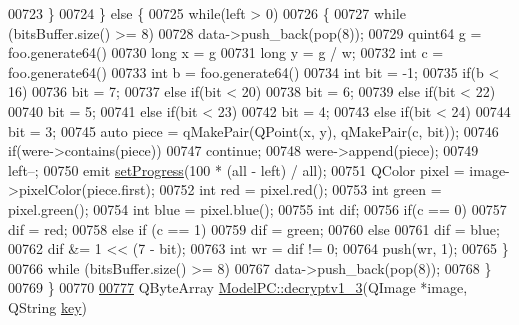 \begin{DoxyCode}
00723         \}
00724     \} \textcolor{keywordflow}{else} \{
00725         \textcolor{keywordflow}{while}(left > 0)
00726         \{
00727             \textcolor{keywordflow}{while} (bitsBuffer.size() >= 8)
00728                 data->push\_back(pop(8));
00729             quint64 g = foo.generate64() %
00730             \textcolor{keywordtype}{long} x = g %
00731             \textcolor{keywordtype}{long} y = g / w;
00732             \textcolor{keywordtype}{int} c = foo.generate64() %
00733             \textcolor{keywordtype}{int} b = foo.generate64() %
00734             \textcolor{keywordtype}{int} bit = -1;
00735             \textcolor{keywordflow}{if}(b < 16)
00736                 bit = 7;
00737             \textcolor{keywordflow}{else} \textcolor{keywordflow}{if}(bit < 20)
00738                 bit = 6;
00739             \textcolor{keywordflow}{else} \textcolor{keywordflow}{if}(bit < 22)
00740                 bit = 5;
00741             \textcolor{keywordflow}{else} \textcolor{keywordflow}{if}(bit < 23)
00742                 bit = 4;
00743             \textcolor{keywordflow}{else} \textcolor{keywordflow}{if}(bit < 24)
00744                 bit = 3;
00745             \textcolor{keyword}{auto} piece = qMakePair(QPoint(x, y), qMakePair(c, bit));
00746             \textcolor{keywordflow}{if}(were->contains(piece))
00747                 \textcolor{keywordflow}{continue};
00748             were->append(piece);
00749             left--;
00750             emit \hyperlink{class_model_p_c_afdcd80f0ed5062e145a71f09b0897547}{setProgress}(100 * (all - left) / all);
00751             QColor pixel = image->pixelColor(piece.first);
00752             \textcolor{keywordtype}{int} red = pixel.red();
00753             \textcolor{keywordtype}{int} green = pixel.green();
00754             \textcolor{keywordtype}{int} blue = pixel.blue();
00755             \textcolor{keywordtype}{int} dif;
00756             \textcolor{keywordflow}{if}(c == 0)
00757                 dif = red;
00758             \textcolor{keywordflow}{else} \textcolor{keywordflow}{if} (c == 1)
00759                 dif = green;
00760             \textcolor{keywordflow}{else}
00761                 dif = blue;
00762             dif &= 1 << (7 - bit);
00763             \textcolor{keywordtype}{int} wr = dif != 0;
00764             push(wr, 1);
00765         \}
00766         \textcolor{keywordflow}{while} (bitsBuffer.size() >= 8)
00767             data->push\_back(pop(8));
00768     \}
00769 \}
00770 
\hypertarget{modelpc_8cpp_source.tex_l00777}{}\hyperlink{class_model_p_c_a4fe70ebbedfaf31d45a35f82d0f06caa}{00777} QByteArray \hyperlink{class_model_p_c_a4fe70ebbedfaf31d45a35f82d0f06caa}{ModelPC::decryptv1\_3}(QImage *image, QString \hyperlink{namespace_errors_dict_setup_a09c268098d09ffb8e5504f30fa6d5dd9}{key})

\end{DoxyCode}
